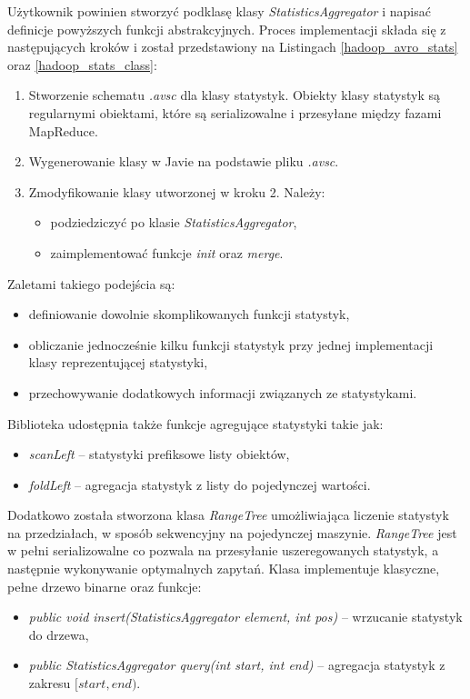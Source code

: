 \documentclass[magisterska]{pracamgr}
\begin{document}
Użytkownik powinien stworzyć podklasę klasy \textit{StatisticsAggregator} i napisać definicje powyższych funkcji abstrakcyjnych. Proces implementacji składa się z następujących kroków i został przedstawiony na Listingach \ref{hadoop_avro_stats} oraz \ref{hadoop_stats_class}:
\begin{enumerate}
    \item Stworzenie schematu \textit{.avsc} dla klasy statystyk. Obiekty klasy statystyk są regularnymi obiektami, które są serializowalne i przesyłane między fazami MapReduce.
    \item Wygenerowanie klasy w Javie na podstawie pliku \textit{.avsc}.
    \item Zmodyfikowanie klasy utworzonej w kroku 2. Należy:
        \begin{itemize}
            \item podziedziczyć po klasie \textit{StatisticsAggregator},
            \item zaimplementować funkcje \textit{init} oraz \textit{merge}.
        \end{itemize}
\end{enumerate}

Zaletami takiego podejścia są:
\begin{itemize}
    \item definiowanie dowolnie skomplikowanych funkcji statystyk,
    \item obliczanie jednocześnie kilku funkcji statystyk przy jednej implementacji klasy reprezentującej statystyki,
    \item przechowywanie dodatkowych informacji związanych ze statystykami.
\end{itemize}

Biblioteka udostępnia także funkcje agregujące statystyki takie jak:
\begin{itemize}
    \item \textit{scanLeft} -- statystyki prefiksowe listy obiektów,
    \item \textit{foldLeft} -- agregacja statystyk z listy do pojedynczej wartości.
\end{itemize}

Dodatkowo została stworzona klasa \textit{RangeTree} umożliwiająca liczenie statystyk na przedziałach, w sposób sekwencyjny na pojedynczej maszynie. \textit{RangeTree} jest w pełni serializowalne co pozwala na przesyłanie uszeregowanych statystyk, a następnie wykonywanie optymalnych zapytań. Klasa implementuje klasyczne, pełne drzewo binarne oraz funkcje:
\begin{itemize}
    \item \textit{public void insert(StatisticsAggregator element, int pos)} -- wrzucanie statystyk do drzewa,
    \item \textit{public StatisticsAggregator query(int start, int end)} -- agregacja statystyk z zakresu \([start, end)\).
\end{itemize}
\end{document}
